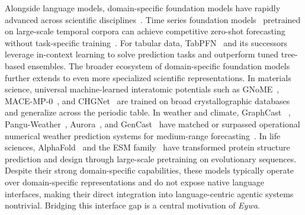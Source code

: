 \documentclass{llmxive}
\begin{document}
{Alongside language models, domain-specific foundation models have rapidly advanced across scientific disciplines~\cite{DBLP:journals/nn/MenonMBPJKJ26,DBLP:journals/corr/abs-2108-07258}.
Time series foundation models~\cite{DBLP:journals/tmlr/AnsariSTZMSSRPK24,DBLP:conf/icml/DasKSZ24, DBLP:conf/icml/WooLKXSS24,DBLP:journals/corr/abs-2310-08278} pretrained on large-scale temporal corpora can achieve competitive zero-shot forecasting without task-specific training~\cite{DBLP:journals/corr/abs-2504-04011}.
For tabular data, TabPFN~\cite{DBLP:conf/iclr/Hollmann0EH23} and its successors~\cite{DBLP:journals/nature/HollmannMPKKHSH25,DBLP:journals/corr/abs-2511-08667} leverage in-context learning to solve prediction tasks and outperform tuned tree-based ensembles.
The broader ecosystem of domain-specific foundation models further extends to even more specialized scientific representations. In materials science, universal machine-learned interatomic potentials such as GNoME~\cite{merchant2023scaling}, MACE-MP-0~\cite{batatia2025foundation}, and CHGNet~\cite{DBLP:journals/natmi/DengZJRHBC23} are trained on broad crystallographic databases and generalize across the periodic table.
In weather and climate, GraphCast ~\cite{DBLP:journals/corr/abs-2212-12794}, Pangu-Weather~\cite{journals/nature/BiXZCG023}, Aurora~\cite{DBLP:journals/nature/BodnarBLSABGRWD25}, and GenCast~\cite{DBLP:journals/nature/PriceSAAEMESMBLW25} have matched or surpassed operational numerical weather prediction systems for medium-range forecasting~\cite{DBLP:journals/corr/abs-2312-03014}.
In life sciences, AlphaFold~\cite{jumper2021highly} and the ESM family~\cite{lin2023evolutionary,hayes2025simulating} have transformed protein structure prediction and design through large-scale pretraining on evolutionary sequences.
Despite their strong domain-specific capabilities, these models typically operate over domain-specific representations and do not expose native language interfaces, making their direct integration into language-centric agentic systems nontrivial. Bridging this interface gap is a central motivation of \textit{Eywa}.


}
\end{document}
